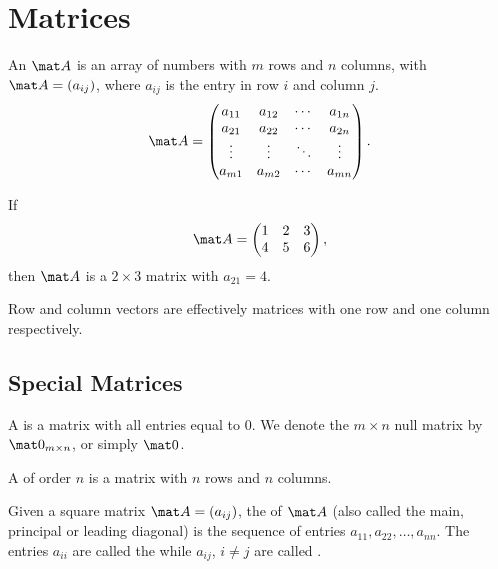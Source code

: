 \chapter{Matrices}

\begin{definition}
    An  $\mat A$ is an array of numbers with $m$ rows and $n$ columns, with $\mat A = (a_{ij})$, where $a_{ij}$ is the entry in row $i$ and column $j$. \[\mat A = \begin{pmatrix}a_{11} & a_{12} & \cdots & a_{1n} \\ a_{21} & a_{22} & \cdots & a_{2n} \\ \vdots & \vdots & \ddots & \vdots \\ a_{m1} & a_{m2} & \cdots & a_{mn} \end{pmatrix}.\]
\end{definition}

\begin{example}
    If \[\mat A = \begin{pmatrix}1 & 2 & 3 \\ 4 & 5 & 6\end{pmatrix},\] then $\mat A$ is a $2 \times 3$ matrix with $a_{21} = 4$.
\end{example}

Row and column vectors are effectively matrices with one row and one column respectively.

\section{Special Matrices}

\begin{definition}
    A  is a matrix with all entries equal to 0. We denote the $m \times n$ null matrix by $\mat 0_{m \times n}$, or simply $\mat 0$.
\end{definition}

\begin{definition}
    A  of order $n$ is a matrix with $n$ rows and $n$ columns.
\end{definition}

\begin{definition}
    Given a square matrix $\mat A = (a_{ij})$, the  of $\mat A$ (also called the main, principal or leading diagonal) is the sequence of entries $a_{11}, a_{22}, \dots, a_{nn}$. The entries $a_{ii}$ are called the  while $a_{ij}$, $i \neq j$ are called .
\end{definition}

